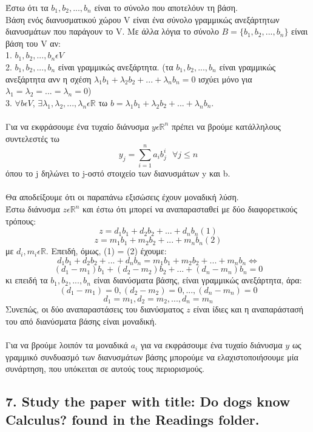 \documentclass[12pt]{article}
\newcommand{\R}{\mathbb{R}}
\begin{document}
Έστω ότι τα $b_1, b_2,...,b_n$ είναι το σύνολο που αποτελόυν τη βάση. \\
Βάση ενός διανυσματικού χώρου V είναι ένα σύνολο γραμμικώς ανεξάρτητων διανυσμάτων που παράγουν το V. Με άλλα λόγια το σύνολο $B=\{b_1,b_2,...,b_n\}$ είναι βάση του V αν: \\
1. $b_1,b_2,...,b_n \epsilon V$ \\
2. $b_1,b_2,...,b_n$ είναι γραμμικώς ανεξάρτητα. (τα $b_1,b_2,...,b_n$ είναι γραμμικώς ανεξάρτητα ανν η σχέση $λ_1b_1 + λ_2b_2 + ... + λ_nb_n = 0$ ισχύει μόνο για $λ_1=λ_2=...=λ_n = 0$) \\
3. $\forall b \epsilon V$, $\exists λ_1,λ_2,...,λ_n \epsilon \R$ τω $b = λ_1b_1 + λ_2b_2 + ... + λ_nb_n$. \\ \\
Για να εκφράσουμε ένα τυχαίο διάνυσμα $y\epsilon \R^n$ πρέπει να βρούμε κατάλληλους συντελεστές τω 
$$ y_j = \sum_{i=1}^{n}{a_ib_j^i} \mbox{     } \forall j \leq n $$ όπου το j δηλώνει το j-οστό στοιχείο των διανυσμάτων y και b. \\ \\
Θα αποδείξουμε ότι οι παραπάνω εξισώσεις έχουν μοναδική λύση. \\
Έστω διάνυσμα $z \epsilon \R^n$ και έστω ότι μπορεί να αναπαρασταθεί με δύο διαφορετικούς τρόπους: \\
$$ z = d_1b_1 + d_2b_2 + ... + d_nb_n (1)$$
$$ z = m_1b_1 + m_2b_2 + ... + m_nb_n (2)$$
με $d_i,m_i \epsilon \R$. Επειδή, όμως, (1) = (2) έχουμε: 
$$ d_1b_1 + d_2b_2 + ... + d_nb_n = m_1b_1 + m_2b_2 + ... + m_nb_n \Leftrightarrow$$
$$ (d_1-m_1)b_1 + (d_2-m_2)b_2 + ... + (d_n-m_n)b_n = 0 $$ 
κι επειδή τα $b_1, b_2, ...,b_n$ είναι διανύσματα βάσης, είναι γραμμικώς ανεξάρτητα, άρα: \\
$$ (d_1-m_1) = 0, (d_2-m_2) = 0, ... , (d_n-m_n) = 0 $$ 
$$ d_1 = m_1, d_2 = m_2, ...,d_n = m_n $$
Συνεπώς, οι δύο αναπαραστάσεις του διανύσματος $z$ είναι ίδιες και η αναπαράστασή του από διανύσματα βάσης είναι μοναδική. \\  \\
Για να βρούμε λοιπόν τα μοναδικά $a_i$ για να εκφράσουμε ένα τυχαίο διάνυσμα $y$ ως γραμμικό συνδυασμό των διανυσμάτων βάσης μπορούμε να ελαχιστοποιήσουμε μία συνάρτηση, που υπόκειται σε αυτούς τους περιορισμούς. \\
\vspace{2in}


\pagebreak

\subsection*{7. Study the paper with title: Do dogs know Calculus? found in the Readings folder.}

\vspace{2in}
\end{document}
